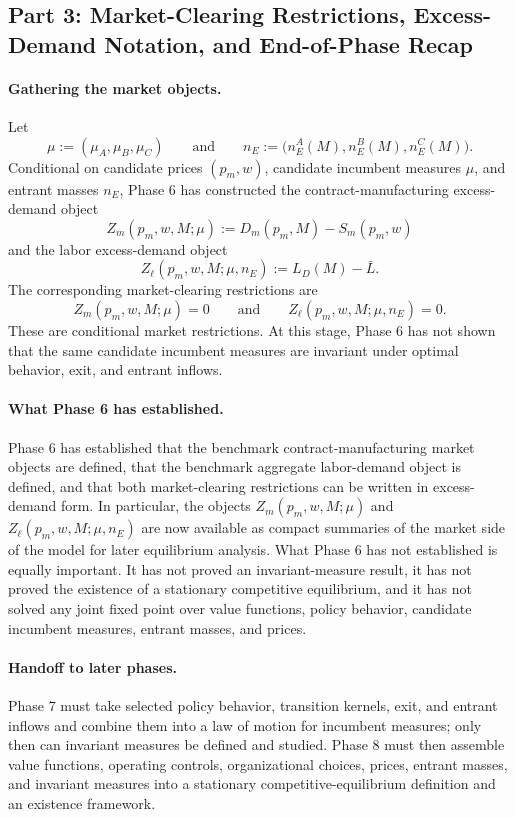 \subsection{Part 3: Market-Clearing Restrictions, Excess-Demand Notation, and End-of-Phase Recap}

\paragraph{Gathering the market objects.}
Let
\[
\mu:=(\mu_A,\mu_B,\mu_C)
\qquad\text{and}\qquad
n_E:=\bigl(n_E^A(M),n_E^B(M),n_E^C(M)\bigr).
\]
Conditional on candidate prices $(p_m,w)$, candidate incumbent measures $\mu$, and entrant masses $n_E$, Phase 6 has constructed the contract-manufacturing excess-demand object
\[
Z_m(p_m,w,M;\mu):=D_m(p_m,M)-S_m(p_m,w)
\]
and the labor excess-demand object
\[
Z_\ell(p_m,w,M;\mu,n_E):=L_D(M)-\bar L.
\]
The corresponding market-clearing restrictions are
\[
Z_m(p_m,w,M;\mu)=0
\qquad\text{and}\qquad
Z_\ell(p_m,w,M;\mu,n_E)=0.
\]
These are conditional market restrictions. At this stage, Phase 6 has not shown that the same candidate incumbent measures are invariant under optimal behavior, exit, and entrant inflows.

\paragraph{What Phase 6 has established.}
Phase 6 has established that the benchmark contract-manufacturing market objects are defined, that the benchmark aggregate labor-demand object is defined, and that both market-clearing restrictions can be written in excess-demand form. In particular, the objects $Z_m(p_m,w,M;\mu)$ and $Z_\ell(p_m,w,M;\mu,n_E)$ are now available as compact summaries of the market side of the model for later equilibrium analysis. What Phase 6 has not established is equally important. It has not proved an invariant-measure result, it has not proved the existence of a stationary competitive equilibrium, and it has not solved any joint fixed point over value functions, policy behavior, candidate incumbent measures, entrant masses, and prices.

\paragraph{Handoff to later phases.}
Phase 7 must take selected policy behavior, transition kernels, exit, and entrant inflows and combine them into a law of motion for incumbent measures; only then can invariant measures be defined and studied. Phase 8 must then assemble value functions, operating controls, organizational choices, prices, entrant masses, and invariant measures into a stationary competitive-equilibrium definition and an existence framework.
